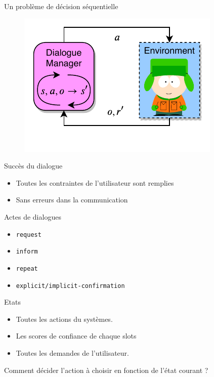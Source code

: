 \documentclass[french,handout]{beamer}
\begin{document}
    \begin{frame}{Un problème de décision séquentielle}
        \begin{figure}
            \centering
            \includegraphics[scale=1.0,page=1]{../sources/dm-rl/rl-pipeline}
        \end{figure}
    \end{frame}
    \begin{frame}
        \begin{block}{Succès du dialogue}
            \begin{itemize}
                \item Toutes les contraintes de l'utilisateur sont remplies
                \item Sans erreurs dans la communication
            \end{itemize}
        \end{block}

        \begin{block}{Actes de dialogues}
            \begin{itemize}
                \item \texttt{request}
                \item \texttt{inform}
                \item \texttt{repeat}
                \item \texttt{explicit/implicit-confirmation}
            \end{itemize}
        \end{block}

        \begin{block}{Etats}
            \begin{itemize}
                \item Toutes les actions du systèmes.
                \item Les scores de confiance de chaque slots
                \item Toutes les demandes de l'utilisateur.
            \end{itemize}
        \end{block}

        \begin{alertblock}{}
            Comment décider l'action à choisir en fonction de l'état courant ?
        \end{alertblock}
    \end{frame}
\end{document}
